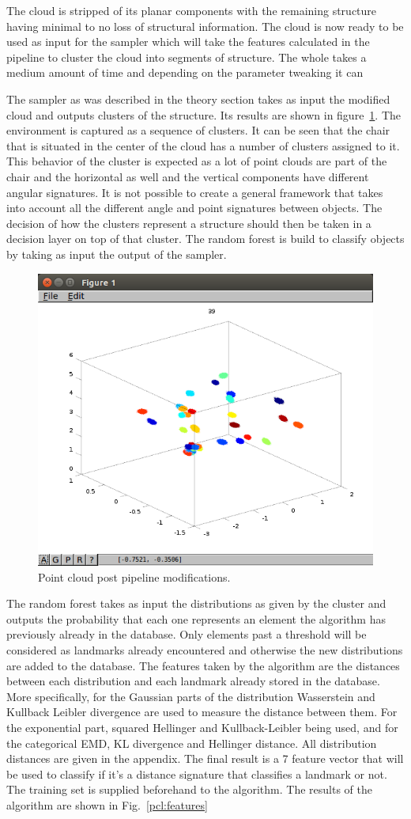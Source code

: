\documentclass[twoside,hidelinks]{article}
\begin{document}
The cloud is stripped of its planar components with the remaining structure having minimal to no loss of structural information. The cloud is now ready to be used as input for the sampler which will take the features calculated in the pipeline to cluster the cloud into segments of structure. The whole takes a medium amount of time and depending on the parameter tweaking it can 

The sampler as was described in the theory section takes as input the modified cloud and outputs clusters of the structure. Its results are shown in figure~\ref{pcl:clustering}. The environment is captured as a sequence of clusters. It can be seen that the chair that is situated in the center of the cloud has a number of clusters assigned to it. This behavior of the cluster is expected as a lot of point clouds are part of the chair and the horizontal as well and the vertical components have different angular signatures. It is not possible to create a general framework that takes into account all the different angle and point signatures between objects. The decision of how the clusters represent a structure should then be taken in a decision layer on top of that cluster. The random forest is build to classify objects by taking as input the output of the sampler.

\begin{figure}[h!]
  \centering
    \includegraphics[width=.5\textwidth]{clustering}
    \caption{Point cloud post pipeline modifications.}
  \label{pcl:clustering}
\end{figure}

The random forest takes as input the distributions as given by the cluster and outputs the probability that each one represents an element the algorithm has previously already in the database. Only elements past a threshold will be considered as landmarks already encountered and otherwise the new distributions are added to the database. The features taken by the algorithm are the distances between each distribution and each landmark already stored in the database. More specifically, for the Gaussian parts of the distribution Wasserstein and Kullback Leibler divergence are used to measure the distance between them. For the exponential part, squared Hellinger and Kullback-Leibler being used, and for the categorical EMD, KL divergence and Hellinger distance. All distribution distances are given in the appendix. The final result is a 7 feature vector that will be used to classify if it's a distance signature that classifies a landmark or not. The training set is supplied beforehand to the algorithm. The results of the algorithm are shown in Fig.~\ref{pcl:features}
\end{document}

